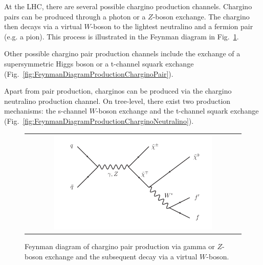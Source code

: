 
At the LHC, there are several possible chargino production channels. 
Chargino pairs can be produced through a photon or a $Z$-boson exchange. 
The chargino then decays via a virtual $W$-boson to the lightest neutralino and a fermion pair (e.g. a pion). 
This process is illustrated in the Feynman diagram in Fig.~\ref{fig:FeynmanDiagram}.


Other possible chargino pair production channels include the exchange of a supersymmetric Higgs boson or a t-channel squark exchange (Fig.~\ref{fig:FeynmanDiagramProductionCharginoPair}).


Apart from pair production, charginos can be produced via the chargino neutralino production channel. 
On tree-level, there exist two production mechanisms: the s-channel $W$-boson exchange and the t-channel squark exchange (Fig.~\ref{fig:FeynmanDiagramProductionCharginoNeutralino}).
\begin{figure}[!h]
  \centering 
  \begin{tabular}{c}
    \includegraphics[width=0.75\textwidth]{figures/analysis/ChiChi_ProductionAndDecay.pdf}
  \end{tabular}
  \caption{Feynman diagram of chargino pair production via gamma or $Z$-boson exchange and the subsequent decay via a virtual $W$-boson.}
  \vspace{30pt}
  \label{fig:FeynmanDiagram}
\end{figure}


